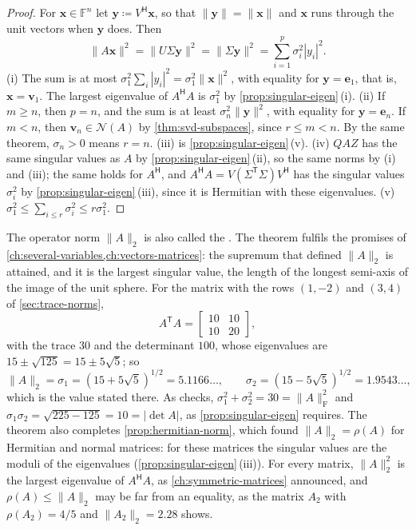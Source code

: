 \begin{proof}
For $\mathbf x\in\mathbb F^n$ let $\mathbf y\coloneqq V^{\mathsf H}\mathbf x$, so that $\|\mathbf y\|=\|\mathbf x\|$ and $\mathbf x$ runs through the unit vectors when $\mathbf y$ does. Then
\[
\|A\mathbf x\|^2=\|U\Sigma\mathbf y\|^2=\|\Sigma\mathbf y\|^2=\sum_{i=1}^p\sigma_i^2|y_i|^2 .
\]
(i) The sum is at most $\sigma_1^2\sum_i|y_i|^2=\sigma_1^2\|\mathbf x\|^2$, with equality for $\mathbf y=\mathbf e_1$, that is, $\mathbf x=\mathbf v_1$. The largest eigenvalue of $A^{\mathsf H}A$ is $\sigma_1^2$ by \cref{prop:singular-eigen}\,(i). (ii) If $m\ge n$, then $p=n$, and the sum is at least $\sigma_n^2\|\mathbf y\|^2$, with equality for $\mathbf y=\mathbf e_n$. If $m<n$, then $\mathbf v_n\in\mathcal N(A)$ by \cref{thm:svd-subspaces}, since $r\le m<n$. By the same theorem, $\sigma_n>0$ means $r=n$. (iii) is \cref{prop:singular-eigen}\,(v). (iv) $QAZ$ has the same singular values as $A$ by \cref{prop:singular-eigen}\,(ii), so the same norms by (i) and (iii); the same holds for $A^{\mathsf H}$, and $A^{\mathsf H}A=V(\Sigma^{\mathsf T}\Sigma)V^{\mathsf H}$ has the singular values $\sigma_i^2$ by \cref{prop:singular-eigen}\,(iii), since it is Hermitian with these eigenvalues. (v) $\sigma_1^2\le\sum_{i\le r}\sigma_i^2\le r\sigma_1^2$.
\end{proof}

The operator norm $\|A\|_2$ is also called the . The theorem fulfils the promises of \cref{ch:several-variables,ch:vectors-matrices}: the supremum that defined $\|A\|_2$ is attained, and it is the largest singular value, the length of the longest semi-axis of the image of the unit sphere. For the matrix with the rows $(1,-2)$ and $(3,4)$ of \cref{sec:trace-norms},
\[
A^{\mathsf T}A=\begin{bmatrix}10&10\\10&20\end{bmatrix},
\]
with the trace $30$ and the determinant $100$, whose eigenvalues are $15\pm\sqrt{125}=15\pm5\sqrt5$; so
\[
\|A\|_2=\sigma_1=(15+5\sqrt5)^{1/2}=5.1166\ldots,\qquad\sigma_2=(15-5\sqrt5)^{1/2}=1.9543\ldots,
\]
which is the value stated there. As checks, $\sigma_1^2+\sigma_2^2=30=\|A\|_{\mathrm F}^2$ and $\sigma_1\sigma_2=\sqrt{225-125}=10=|\det A|$, as \cref{prop:singular-eigen} requires. The theorem also completes \cref{prop:hermitian-norm}, which found $\|A\|_2=\rho(A)$ for Hermitian and normal matrices: for these matrices the singular values are the moduli of the eigenvalues (\cref{prop:singular-eigen}\,(iii)). For every matrix, $\|A\|_2^2$ is the largest eigenvalue of $A^{\mathsf H}A$, as \cref{ch:symmetric-matrices} announced, and $\rho(A)\le\|A\|_2$ may be far from an equality, as the matrix $A_2$ with $\rho(A_2)=4/5$ and $\|A_2\|_2=2.28$ shows.

